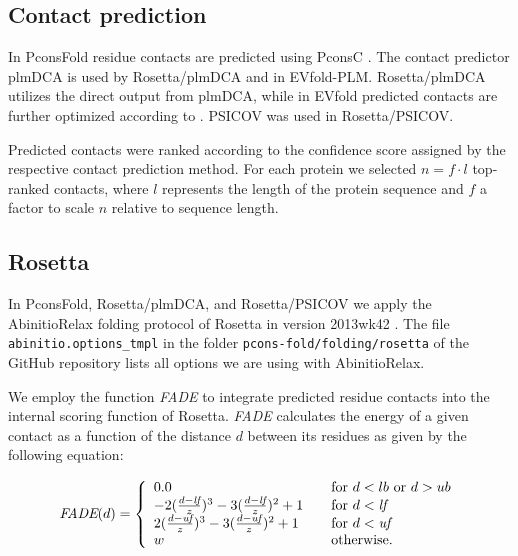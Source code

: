 \documentclass{bioinfo}
\begin{document}
\begin{methods}
\subsection{Contact prediction}
In PconsFold residue contacts are predicted using
PconsC \cite[]{skwark_PconsC:_2013}. The contact predictor
plmDCA \cite[]{ekeberg_improved_2013} is used by Rosetta/plmDCA and in
EVfold-PLM. Rosetta/plmDCA utilizes the direct output from plmDCA,
while in EVfold predicted contacts are further optimized according to
\cite{marks_protein_2011}. PSICOV \cite[]{jones_psicov:_2012} was used
in Rosetta/PSICOV.


Predicted contacts were ranked according to the confidence score
assigned by the respective contact prediction method. For each protein
we selected $n = f \cdot l$ top-ranked contacts, where $l$ represents
the length of the protein sequence and $f$ a factor to scale $n$
relative to sequence length.



\subsection{Rosetta}
In PconsFold, Rosetta/plmDCA, and Rosetta/PSICOV we apply the
AbinitioRelax folding protocol \cite[]{rohl_protein_2004} of Rosetta
in version 2013wk42 \cite[]{leaver-fay_rosetta3:_2011}. The file {\tt
 abinitio.options\_tmpl} in the folder {\tt pcons-fold/folding/rosetta} of the GitHub
repository lists all options we are using with AbinitioRelax. 

We employ the function \emph{FADE} to integrate predicted residue
contacts into the internal scoring function of Rosetta. \emph{FADE}
calculates the energy of a given contact as a function of the distance
$d$ between its residues as given by the following equation:

\begin{equation}%
\textit{FADE}(d) = \left\{
\begin{array}{l l l}\label{eq:fade}
0.0 & \quad \textrm{for $d < lb$ or $d > ub$} \\
-2(\frac{d - \textit{lf}}{z})^3 - 3(\frac{d - \textit{lf}}{z})^2 + 1 & \quad \textrm{for $d < \textit{lf}$} \\
2(\frac{d - \textit{uf}}{z})^3 - 3(\frac{d - \textit{uf}}{z})^2 + 1 & \quad \textrm{for $d < \textit{uf}$} \\
w & \quad \textrm{otherwise.} \\
\end{array} \right.
\end{equation}


\end{methods}
\end{document}
